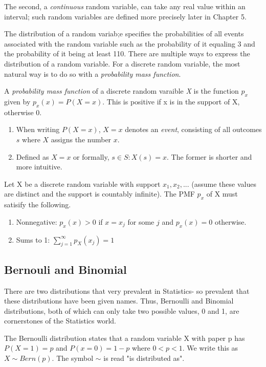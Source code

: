 \documentclass[12pt, letterpaper]{article}
\begin{document}
The second, a \textit{continuous} random variable, can take any real value within an interval; such random variables are defined more precisely later in Chapter 5.

The distribution of a random variab;e specifies the probabilities of all events associated with the random variable such as the probability of it equaling 3 and the probability of it being at least 110. There are multiple ways to express the distribution of a random variable. For a discrete random variable, the most natural way is to do so with a \textit{probability mass function}.

A \textit{probability mass function} of a discrete random varaible \textit{X} is the function \(p_x\) given by \(p_x(x) = P(X = x)\). This is positive if x is in the support of X, otherwise 0.
\begin{enumerate}
    \item When writing \(P(X = x)\), \(X = x\) denotes an \textit{event}, consisting of all outcomes \(s\) where \(X\) assigns the number \(x\).
    \item Defined as \({X = x}\) or formally, \({s \in S : X(s) = x}\). The former is shorter and more intuitive.
\end{enumerate}

Let X be a discrete random variable with support \(x_1, x_2, ...\) (assume these values are distinct and the support is countably infinite). The PMF \(p_x\) of X must satisify the following.
\begin{enumerate}
    \item Nonnegative: \(p_x(x) > 0\) if \(x = x_j\) for some \(j\) and \(p_x(x) = 0\) otherwise. 
    \item Sums to 1: \(\sum_{j = 1}^{\infty }p_X(x_j) = 1\)
\end{enumerate}

\subsection{Bernouli and Binomial}

There are two distributions that very prevalent in Statistics- so prevalent that these distributions have been given names. Thus, Bernoulli and Binomial distributions, both of which can only take two possible values, 0 and 1, are cornerstones of the Statistics world.

The Bernoulli distribution states that a random variable X with paper p has \(P(X = 1) = p\) and \(P(x = 0) = 1 - p\) where \(0 < p < 1\). We write this as \(X \sim Bern(p)\). The symbol \(\sim\) is read "is distributed as".
\end{document}
